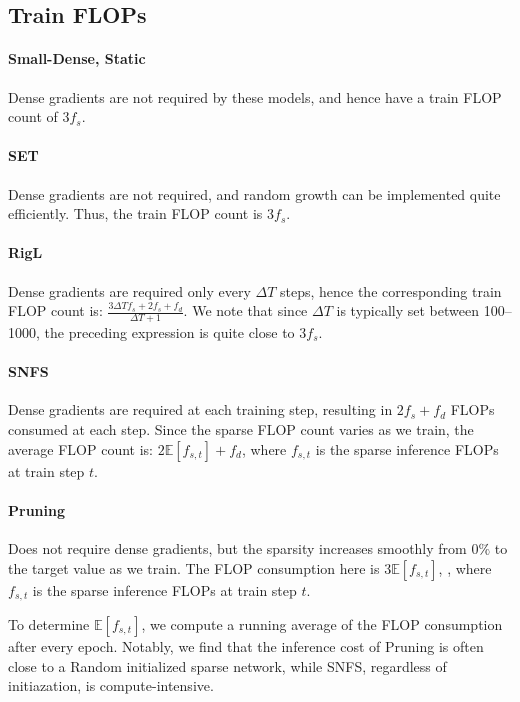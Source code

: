 \subsection{Train FLOPs}

\paragraph{Small-Dense, Static} Dense gradients are not required by these models, and hence have a train FLOP count of $3f_s$.

\paragraph{SET} Dense gradients are not required, and random growth can be implemented quite efficiently. Thus, the train FLOP count is $3f_s$.

\paragraph{RigL} Dense gradients are required only every $\Delta T$ steps, hence the corresponding train FLOP count is: $\frac{3\Delta Tf_s + 2f_s + f_d }{\Delta T + 1}$. We note that since $\Delta T$ is typically set between 100--1000, the preceding expression is quite close to $3f_s$.

\paragraph{SNFS} Dense gradients are required at each training step, resulting in $2f_s + f_d$ FLOPs consumed at each step. Since the sparse FLOP count varies as we train, the average FLOP count is: $2\mathbb{E}[f_{s,t}] + f_d$, where $f_{s,t}$ is the sparse inference FLOPs at train step $t$.

\paragraph{Pruning} Does not require dense gradients, but the sparsity increases smoothly from $0\%$ to the target value as we train. The FLOP consumption here is $3\mathbb{E}[f_{s,t}]$, , where $f_{s,t}$ is the sparse inference FLOPs at train step $t$.

To determine $\mathbb{E}[f_{s,t}]$, we compute a running average of the FLOP consumption after every epoch. Notably, we find that the inference cost of Pruning is often close to a Random initialized sparse network, while SNFS, regardless of initiazation, is compute-intensive.